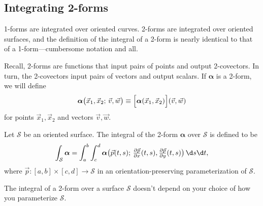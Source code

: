 \subsection{Integrating 2-forms}

1-forms are integrated over oriented curves.  2-forms are integrated over oriented
surfaces, and the definition of the integral of a 2-form
is nearly identical to that of a 1-form---cumbersome notation and all.

Recall, 2-forms are functions that input pairs of points and output 2-covectors.
In turn, the 2-covectors input pairs of vectors and output scalars.  If
$\bm \alpha$ is a 2-form, we will define
\[
	\bm\alpha\big(\vec x_1,\vec x_2;\, \vec v,\vec w\big)\equiv
	\Big[\bm\alpha(\vec x_1,\vec x_2)\Big](\vec v,\vec w)
\]
for points $\vec x_1,\vec x_2$ and vectors $\vec v,\vec w$.

\begin{definition}
	Let $\mathcal S$ be an oriented surface. The integral of
	the 2-form $\bm\alpha$ over $\mathcal S$ is defined to be
	\[
		\int_{\mathcal S} \bm\alpha 
		=\int_a^b\int _c^d \bm\alpha
		\formarg{\vec p(t,s)}{\tfrac{\partial \vec p}{\partial x}(t,s),
		\tfrac{\partial\vec p}{\partial y}(t,s)}\,\d s \d t,
	\]
	where $\vec p:[a,b]\times [c,d]\to\mathcal S$ in an 
	orientation-preserving parameterization of $\mathcal S$.
\end{definition}

The integral of a 2-form over a surface $\mathcal S$
doesn't depend on your choice of how you parameterize $\mathcal S$.

